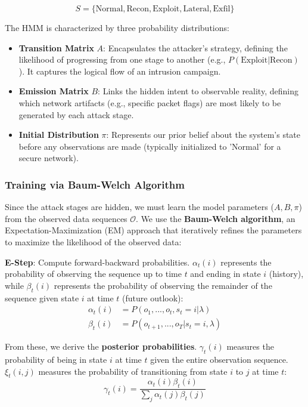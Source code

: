 \documentclass[conference]{IEEEtran}
\begin{document}
\begin{equation}
S = \{\text{Normal}, \text{Recon}, \text{Exploit}, \text{Lateral}, \text{Exfil}\}
\end{equation}

The HMM is characterized by three probability distributions:
\begin{itemize}
    \item \textbf{Transition Matrix} $A$: Encapsulates the attacker's strategy, defining the likelihood of progressing from one stage to another (e.g., $P(\text{Exploit}|\text{Recon})$). It captures the logical flow of an intrusion campaign.
    \item \textbf{Emission Matrix} $B$: Links the hidden intent to observable reality, defining which network artifacts (e.g., specific packet flags) are most likely to be generated by each attack stage.
    \item \textbf{Initial Distribution} $\pi$: Represents our prior belief about the system's state before any observations are made (typically initialized to 'Normal' for a secure network).
\end{itemize}

\subsubsection{Training via Baum-Welch Algorithm}
Since the attack stages are hidden, we must learn the model parameters ($A, B, \pi$) from the observed data sequences $\mathcal{O}$. We use the \textbf{Baum-Welch algorithm}, an Expectation-Maximization (EM) approach that iteratively refines the parameters to maximize the likelihood of the observed data:

\textbf{E-Step}: Compute forward-backward probabilities. $\alpha_t(i)$ represents the probability of observing the sequence up to time $t$ and ending in state $i$ (history), while $\beta_t(i)$ represents the probability of observing the remainder of the sequence given state $i$ at time $t$ (future outlook):
\begin{align}
\alpha_t(i) &= P(o_1,...,o_t, s_t=i | \lambda) \\
\beta_t(i) &= P(o_{t+1},...,o_T | s_t=i, \lambda)
\end{align}

From these, we derive the \textbf{posterior probabilities}. $\gamma_t(i)$ measures the probability of being in state $i$ at time $t$ given the entire observation sequence. $\xi_t(i,j)$ measures the probability of transitioning from state $i$ to $j$ at time $t$:
\begin{equation}
\gamma_t(i) = \frac{\alpha_t(i)\beta_t(i)}{\sum_j \alpha_t(j)\beta_t(j)}
\end{equation}
\end{document}

